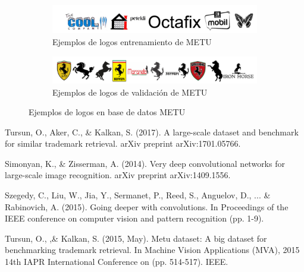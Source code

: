 \documentclass[conference]{IEEEtran}
\begin{document}
\begin{figure}[h!]
\centering
	\begin{subfigure}[b]{0.8\linewidth}
		\includegraphics[width=\linewidth]{images/metudataset.png}
		\caption{Ejemplos de logos entrenamiento de METU}
	\end{subfigure}

  	\begin{subfigure}[b]{0.8\linewidth}
		\includegraphics[width=\linewidth]{images/queriesmetu2}
		\caption{Ejemplos de logos de validación de METU}
  	 \end{subfigure}
  	\caption{Ejemplos de logos en base de datos METU}
  	\label{fig:logosMatu}
\end{figure} 

\begin{thebibliography}{00}

 Tursun, O., Aker, C., \& Kalkan, S. (2017). A large-scale dataset and benchmark for similar trademark retrieval. arXiv preprint arXiv:1701.05766.

 Simonyan, K., \& Zisserman, A. (2014). Very deep convolutional networks for large-scale image recognition. arXiv preprint arXiv:1409.1556.

 Szegedy, C., Liu, W., Jia, Y., Sermanet, P., Reed, S., Anguelov, D., ... \& Rabinovich, A. (2015). Going deeper with convolutions. In Proceedings of the IEEE conference on computer vision and pattern recognition (pp. 1-9).

 Tursun, O., ,\& Kalkan, S. (2015, May). Metu dataset: A big dataset for benchmarking trademark retrieval. In Machine Vision Applications (MVA), 2015 14th IAPR International Conference on (pp. 514-517). IEEE.

\end{thebibliography}
\end{document}

